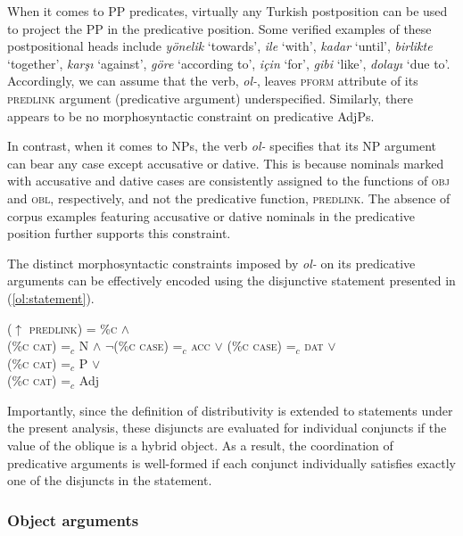 When it comes to PP predicates, virtually any Turkish postposition can be used to project the PP in the predicative position. Some verified examples of these postpositional heads include \textit{yönelik} `towards', \textit{ile} `with', \textit{kadar} `until', \textit{birlikte} `together', \textit{karşı} `against', \textit{göre} `according to', \textit{için} `for', \textit{gibi} `like', \textit{dolayı} `due to'. Accordingly, we can assume that the verb, \textit{ol-}, leaves \textsc{pform} attribute of its \textsc{predlink} argument (predicative argument) underspecified. Similarly, there appears to be no morphosyntactic constraint on predicative AdjPs.

In contrast, when it comes to NPs, the verb \textit{ol-} specifies that its NP argument can bear any case except accusative or dative. This is because nominals marked with accusative and dative cases are consistently assigned to the functions of \textsc{obj} and \textsc{obl}, respectively, and not the predicative function, \textsc{predlink}. The absence of corpus examples featuring accusative or dative nominals in the predicative position further supports this constraint.

The distinct morphosyntactic constraints imposed by \textit{ol-} on its predicative arguments can be effectively encoded using the disjunctive statement presented in (\ref{ol:statement}). 

\ex
\label{ol:statement}
($\uparrow$ \textsc{predlink}) = \%\textsc{c} $\land$ \\
\vspace{3pt}\text{[[}(\%\textsc{c cat}) =$_c$ N $\land$ $\neg$\text{[}(\%\textsc{c case}) =$_c$ \textsc{acc} $\lor$ (\%\textsc{c case}) =$_c$ \textsc{dat}\text{]]} $\lor$ \\
(\%\textsc{c cat})  =$_c$ P $\lor$ \\
(\%\textsc{c cat})  =$_c$ Adj\text{]]}
\xe

Importantly, since the definition of distributivity is extended to statements under the present analysis, these disjuncts are evaluated for individual conjuncts if the value of the oblique is a hybrid object. As a result, the coordination of predicative arguments is well-formed if each conjunct individually satisfies exactly one of the disjuncts in the statement.

\subsubsection{Object arguments}

